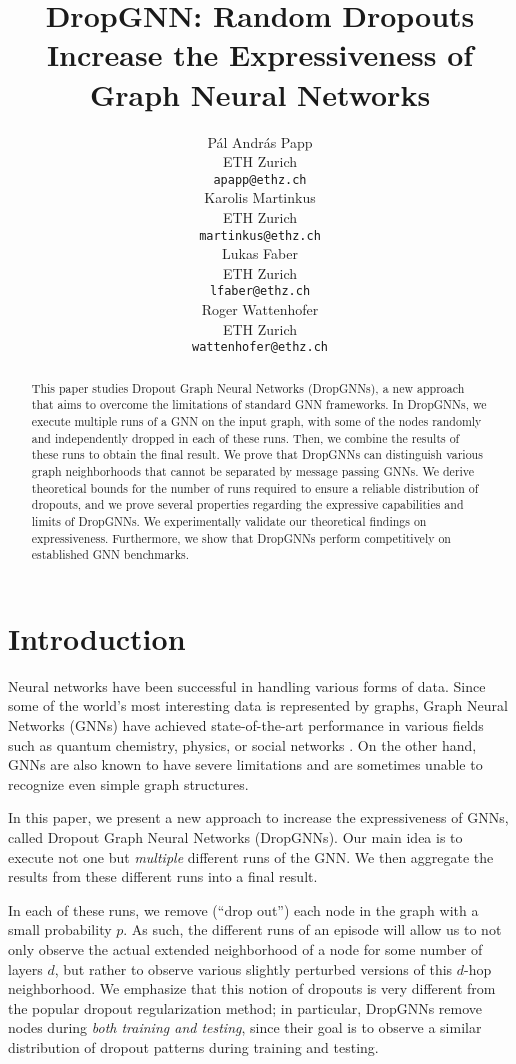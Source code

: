 \documentclass{article}
\title{DropGNN: Random Dropouts Increase the Expressiveness of Graph Neural Networks}
\author{
  Pál András Papp \\
  ETH Zurich \\
  \texttt{apapp@ethz.ch} \\
  \And
  Karolis Martinkus \\
  ETH Zurich \\
  \texttt{martinkus@ethz.ch} \\
  \And
  Lukas Faber \\
  ETH Zurich \\
  \texttt{lfaber@ethz.ch} \\
  \And
  Roger Wattenhofer \\
  ETH Zurich \\
  \texttt{wattenhofer@ethz.ch} \\
}
\begin{document}
\maketitle

\begin{abstract}
This paper studies Dropout Graph Neural Networks (DropGNNs), a new approach that aims to overcome the limitations of standard GNN frameworks. In DropGNNs, we execute multiple runs of a GNN on the input graph, with some of the nodes randomly and independently dropped in each of these runs. Then, we combine the results of these runs to obtain the final result. We prove that DropGNNs can distinguish various graph neighborhoods that cannot be separated by message passing GNNs. We derive theoretical bounds for the number of runs required to ensure a reliable distribution of dropouts, and we prove several properties regarding the expressive capabilities and limits of DropGNNs. We experimentally validate our theoretical findings on expressiveness. Furthermore, we show that DropGNNs perform competitively on established GNN benchmarks.
\end{abstract}

\section{Introduction}

Neural networks have been successful in handling various forms of data. Since some of the world's most interesting data is represented by graphs, Graph Neural Networks (GNNs) have achieved state-of-the-art performance in various fields such as quantum chemistry, physics, or social networks \citep{gilmer2017neural, sanchez2020learning,  kipf2017semisupervised}. On the other hand, GNNs are also known to have severe limitations and are sometimes unable to recognize even simple graph structures.


In this paper, we present a new approach to increase the expressiveness of GNNs, called Dropout Graph Neural Networks (DropGNNs). Our main idea is to execute not one but \textit{multiple} different runs of the GNN. We then aggregate the results from these different runs into a final result.

In each of these runs, we remove (``drop out'') each node in the graph with a small probability $p$. As such, the different runs of an episode will allow us to not only observe the actual extended neighborhood of a node for some number of layers $d$, but rather to observe various slightly perturbed versions of this $d$-hop neighborhood. We emphasize that this notion of dropouts is very different from the popular dropout regularization method; in particular, DropGNNs remove nodes during \emph{both training and testing}, since their goal is to observe a similar distribution of dropout patterns during training and testing.
\end{document}
